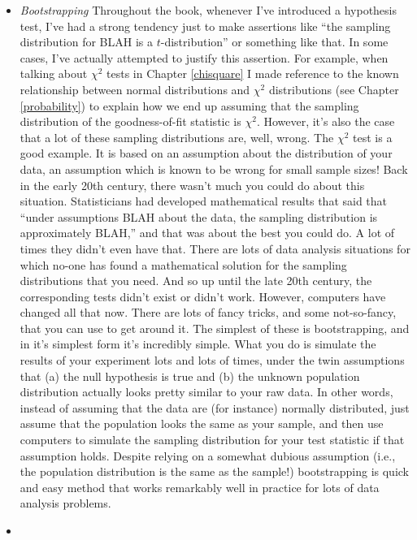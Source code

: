 \documentclass[
]{book}
\begin{document}
\begin{itemize}
\item
  \emph{Bootstrapping} Throughout the book, whenever I've introduced a hypothesis test, I've had a strong tendency just to make assertions like ``the sampling distribution for BLAH is a \(t\)-distribution'' or something like that. In some cases, I've actually attempted to justify this assertion. For example, when talking about \(\chi^2\) tests in Chapter \ref{chisquare} I made reference to the known relationship between normal distributions and \(\chi^2\) distributions (see Chapter \ref{probability}) to explain how we end up assuming that the sampling distribution of the goodness-of-fit statistic is \(\chi^2\). However, it's also the case that a lot of these sampling distributions are, well, wrong. The \(\chi^2\) test is a good example. It is based on an assumption about the distribution of your data, an assumption which is known to be wrong for small sample sizes! Back in the early 20th century, there wasn't much you could do about this situation. Statisticians had developed mathematical results that said that ``under assumptions BLAH about the data, the sampling distribution is approximately BLAH,'' and that was about the best you could do. A lot of times they didn't even have that. There are lots of data analysis situations for which no-one has found a mathematical solution for the sampling distributions that you need. And so up until the late 20th century, the corresponding tests didn't exist or didn't work. However, computers have changed all that now. There are lots of fancy tricks, and some not-so-fancy, that you can use to get around it. The simplest of these is bootstrapping, and in it's simplest form it's incredibly simple. What you do is simulate the results of your experiment lots and lots of times, under the twin assumptions that (a) the null hypothesis is true and (b) the unknown population distribution actually looks pretty similar to your raw data. In other words, instead of assuming that the data are (for instance) normally distributed, just assume that the population looks the same as your sample, and then use computers to simulate the sampling distribution for your test statistic if that assumption holds. Despite relying on a somewhat dubious assumption (i.e., the population distribution is the same as the sample!) bootstrapping is quick and easy method that works remarkably well in practice for lots of data analysis problems.
\item

\end{itemize}
\end{document}
